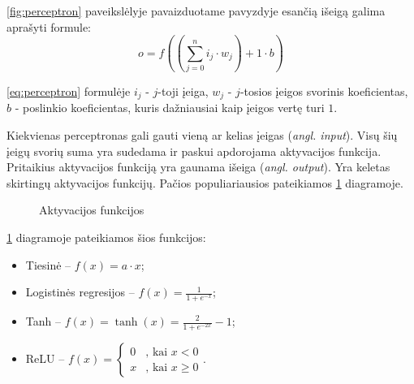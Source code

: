 \documentclass{VUMIFPSbakalaurinis}
\begin{document}
\ref{fig:perceptron} paveikslėlyje pavaizduotame pavyzdyje esančią išeigą galima aprašyti formule:
\begin{equation}
	o = f((\sum_{j=0}^{n}i_j \cdot w_j) + 1 \cdot b)
	\label{eq:perceptron}
\end{equation}

\ref{eq:perceptron} formulėje $i_j$ - $j$-toji įeiga, $w_j$ - $j$-tosios įeigos svorinis koeficientas, $b$ - poslinkio koeficientas, kuris dažniausiai kaip įeigos vertę turi $1$.

Kiekvienas perceptronas gali gauti vieną ar kelias įeigas (\textit{angl. input}). Visų šių įeigų svorių suma yra sudedama ir paskui apdorojama aktyvacijos funkcija. Pritaikius aktyvacijos funkciją yra gaunama išeiga (\textit{angl. output}). Yra keletas skirtingų aktyvacijos funkcijų. Pačios populiariausios pateikiamos \ref{fig:aktyvacijosfunkc} diagramoje.
\begin{figure}[H]
	\centering
	
	
	\caption{Aktyvacijos funkcijos} \label{fig:aktyvacijosfunkc}
\end{figure}


\ref{fig:aktyvacijosfunkc} diagramoje pateikiamos šios funkcijos:

\begin{itemize}
	\item Tiesinė – $f(x) = a \cdot x$;
	\item Logistinės regresijos – $f(x) = \frac{1}{1+e^{-x}}$;
	\item Tanh – $f(x) = \tanh(x) = \frac{2}{1+e^{-2x}} - 1$;
	\item ReLU – $f(x) = \begin{cases}
	0 & \text{, kai } x < 0 \\
	x & \text{, kai } x \ge 0
	\end{cases} $.
\end{itemize}
\end{document}
